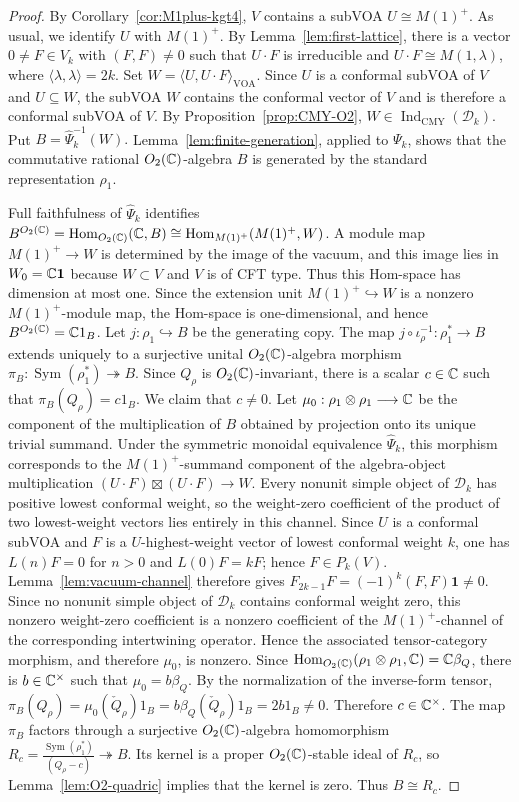 \documentclass[10pt,a4paper]{amsart}
\numberwithin{equation}{section} \newtheorem{thm}{Theorem}[section] \newtheorem{lem}[thm]{Lemma} \newtheorem{ex}[thm]{Example} \newtheorem{prop}[thm]{Proposition} \newtheorem{cor}[thm]{Corollary} \newtheorem{defi}[thm]{Definition} \newtheorem{rmk}[thm]{Remark} \newtheorem{notation}[thm]{Notation}
\newcommand{\one}{\mathbf{1}}
\newcommand{\Sym}{\operatorname{Sym}}
\newcommand{\Hom}{\operatorname{Hom}}
\newcommand{\Dk}{\mathcal D_k}
\newcommand{\IndCMY}{\operatorname{Ind}_{\mathrm{CMY}}}
\newcommand{\Otwo}{O_2(\C)}
\begin{document}
\begin{proof}
By Corollary~\ref{cor:M1plus-kgt4}, $V$ contains a subVOA \(U\cong M(1)^+.\) As usual, we identify $U$ with $M(1)^+$. By Lemma~\ref{lem:first-lattice}, there is a vector $0\ne F\in V_k$ with $(F,F)\ne0$ such that $U\cdot F$ is irreducible and \(U\cdot F\cong M(1,\lambda)\), where \(\langle\lambda,\lambda\rangle=2k\). Set \(W=\langle U,U\cdot F\rangle_{\mathrm{VOA}}.\) Since $U$ is a conformal subVOA of $V$ and $U\subseteq W$, the subVOA $W$ contains the conformal vector of $V$ and is therefore a conformal subVOA of $V$. By Proposition~\ref{prop:CMY-O2}, $W\in\IndCMY(\Dk)$. Put \(B=\widehat\Psi_k^{-1}(W).\) Lemma~\ref{lem:finite-generation}, applied to $\Psi_k$, shows that the commutative rational $\Otwo$-algebra $B$ is generated by the standard representation $\rho_1$.

Full faithfulness of $\widehat\Psi_k$ identifies \(B^{\Otwo}=\Hom_{\Otwo}(\C,B)\cong\Hom_{M(1)^+}(M(1)^+,W)\). A module map $M(1)^+\to W$ is determined by the image of the vacuum, and this image lies in $W_0=\C\one$ because $W\subset V$ and $V$ is of CFT type. Thus this Hom-space has dimension at most one. Since the extension unit $M(1)^+\hookrightarrow W$ is a nonzero $M(1)^+$-module map, the Hom-space is one-dimensional, and hence $B^{\Otwo}=\C1_B$. Let $j:\rho_1\hookrightarrow B$ be the generating copy. The map \(j\circ\iota_\rho^{-1}:\rho_1^*\longrightarrow B\) extends uniquely to a surjective unital $\Otwo$-algebra morphism \(\pi_B:\Sym(\rho_1^*)\twoheadrightarrow B\). Since $Q_\rho$ is $\Otwo$-invariant, there is a scalar $c\in\mathbb{C}$ such that \(\pi_B(Q_\rho)=c1_B\). We claim that $c\ne0$. Let \(\mu_0:\rho_1\otimes\rho_1\longrightarrow\mathbb{C}\) be the component of the multiplication of $B$ obtained by projection onto its unique trivial summand. Under the symmetric monoidal equivalence $\widehat\Psi_k$, this morphism corresponds to the $M(1)^+$-summand component of the algebra-object multiplication \((U\cdot F)\boxtimes(U\cdot F)\longrightarrow W\). Every nonunit simple object of $\Dk$ has positive lowest conformal weight, so the weight-zero coefficient of the product of two lowest-weight vectors lies entirely in this channel. Since $U$ is a conformal subVOA and $F$ is a $U$-highest-weight vector of lowest conformal weight $k$, one has $L(n)F=0$ for $n>0$ and $L(0)F=kF$; hence $F\in P_k(V)$. Lemma~\ref{lem:vacuum-channel} therefore gives \(F_{2k-1}F=(-1)^k(F,F)\one\ne0\). Since no nonunit simple object of $\Dk$ contains conformal weight zero, this nonzero weight-zero coefficient is a nonzero coefficient of the $M(1)^+$-channel of the corresponding intertwining operator. Hence the associated tensor-category morphism, and therefore $\mu_0$, is nonzero. Since \(\Hom_{\Otwo}(\rho_1\otimes\rho_1,\C)=\C\beta_Q\), there is $b\in\mathbb{C}^\times$ such that $\mu_0=b\beta_Q$. By the normalization of the inverse-form tensor, \(\pi_B(Q_\rho) =\mu_0(\check Q_\rho)1_B =b\beta_Q(\check Q_\rho)1_B =2b1_B\ne0.\) Therefore $c\in\mathbb{C}^\times$. The map $\pi_B$ factors through a surjective $\Otwo$-algebra homomorphism \(R_c=\frac{\Sym(\rho_1^*)}{(Q_\rho-c)}\twoheadrightarrow B\). Its kernel is a proper $\Otwo$-stable ideal of $R_c$, so Lemma~\ref{lem:O2-quadric} implies that the kernel is zero. Thus \(B\cong R_c.\)


\end{proof}
\end{document}
